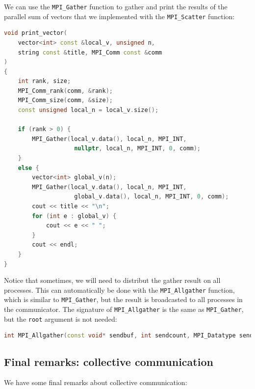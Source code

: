 We can use the \texttt{MPI\_Gather} function to gather and print the results of the parallel
sum of vectors that we implemented with the \texttt{MPI\_Scatter} function:

\begin{lstlisting}[language=C++]
void print_vector(
    vector<int> const &local_v, unsigned n, 
    string const &title, MPI_Comm const &comm
)
{
    int rank, size;
    MPI_Comm_rank(comm, &rank);
    MPI_Comm_size(comm, &size);
    const unsigned local_n = local_v.size();

    if (rank > 0) {
        MPI_Gather(local_v.data(), local_n, MPI_INT, 
                    nullptr, local_n, MPI_INT, 0, comm);
    }
    else {
        vector<int> global_v(n);
        MPI_Gather(local_v.data(), local_n, MPI_INT, 
                    global_v.data(), local_n, MPI_INT, 0, comm);
        cout << title << "\n";
        for (int e : global_v) {
            cout << e << " ";
        }
        cout << endl;
    }
}
\end{lstlisting}

Notice that sometimes, we will need to distribut the gather result on all processes.
This can automatically be done with the \texttt{MPI\_Allgather} function, which is similar
to \texttt{MPI\_Gather}, but the result is broadcasted to all processes in the communicator.
The signature of \texttt{MPI\_Allgather} is the same as \texttt{MPI\_Gather}, but the \texttt{root}
argument is not needed:

\begin{lstlisting}[language=C++]
int MPI_Allgather(const void* sendbuf, int sendcount, MPI_Datatype sendtype, void* recvbuf, int recvcount, MPI_Datatype recvtype, MPI_Comm comm);
\end{lstlisting}

\subsection{Final remarks: collective communication}

We have some final remarks about collective communication:

